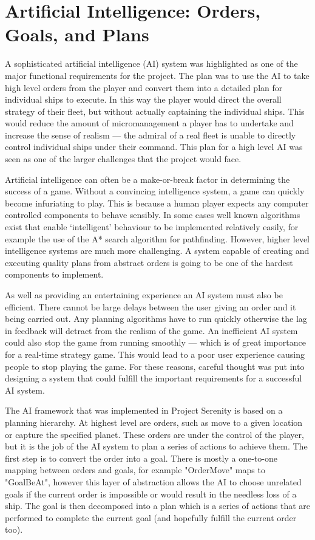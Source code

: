\section{Artificial Intelligence: Orders, Goals, and Plans}

A sophisticated artificial intelligence (AI) system was highlighted as one of the major
functional requirements for the project. The plan was to use the AI to take high
level orders from the player and convert them into a detailed plan for individual
ships to execute. In this way the player would direct the overall strategy of their
fleet, but without actually captaining the individual ships. This would reduce the
amount of micromanagement a player has to undertake and increase the sense of realism
--- the admiral of a real fleet is unable to directly control individual ships under
their command. This plan for a high level AI was seen as one of the larger challenges
that the project would face.

Artificial intelligence can often be a make-or-break factor in determining the success of
a game. Without a convincing intelligence system, a game can
quickly become infuriating to play. This is because a human player expects any computer
controlled components to behave sensibly. In some cases well known algorithms exist that
enable `intelligent' behaviour to be implemented relatively easily, for example the use
of the A* search algorithm for pathfinding. However, higher level intelligence systems
are much more challenging. A system capable of creating and executing quality plans
from abstract orders is going to be one of the hardest components to implement.

As well as providing an entertaining experience an AI system must also be efficient.
There cannot be large delays between the user giving an order and it being carried
out. Any planning algorithms have to run quickly otherwise the lag in feedback will
detract from the realism of the game. An inefficient AI system could also stop the game
from running smoothly --- which is of great importance for a real-time strategy game.
This would lead to a poor user experience causing people to stop playing the game.
For these reasons, careful thought was put into designing a system that could fulfill
the important requirements for a successful AI system.

The AI framework that was implemented in Project Serenity is based on a planning
hierarchy. At highest level are orders, such as move to a given location or capture
the specified planet. These orders are under the control of the player, but it is
the job of the AI system to plan a series of actions to achieve them. The first step
is to convert the order into a goal. There is mostly a one-to-one mapping between
orders and goals, for example "OrderMove" maps to "GoalBeAt", however this layer of
abstraction allows the AI to choose unrelated goals if the current order is impossible
or would result in the needless loss of a ship. The goal is then decomposed into a
plan which is a series of actions that are performed to complete the current goal
(and hopefully fulfill the current order too).

